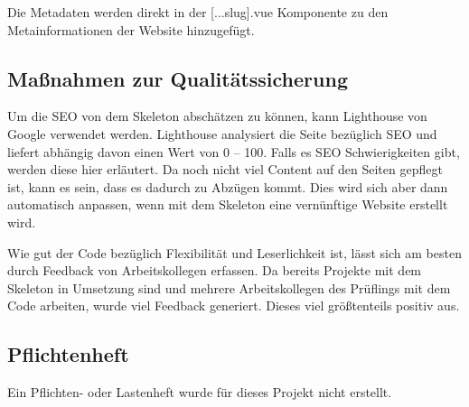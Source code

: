 Die Metadaten werden direkt in der [...slug].vue Komponente zu den Metainformationen der Website hinzugefügt.

\subsection{Maßnahmen zur Qualitätssicherung}
\label{sec:Qualitaetssicherung}

Um die SEO von dem Skeleton abschätzen zu können, kann Lighthouse von Google verwendet werden. Lighthouse analysiert die Seite bezüglich SEO und liefert abhängig davon einen Wert von 0 – 100. Falls es SEO Schwierigkeiten gibt, werden diese hier erläutert. Da noch nicht viel Content auf den Seiten gepflegt ist, kann es sein, dass es dadurch zu Abzügen kommt. Dies wird sich aber dann automatisch anpassen, wenn mit dem Skeleton eine vernünftige Website erstellt wird.

Wie gut der Code bezüglich Flexibilität und Leserlichkeit ist, lässt sich am besten durch Feedback von Arbeitskollegen erfassen. Da bereits Projekte mit dem Skeleton in Umsetzung sind und mehrere Arbeitskollegen des Prüflings mit dem Code arbeiten, wurde viel Feedback generiert. Dieses viel größtenteils positiv aus.

\subsection{Pflichtenheft}
\label{sec:Pflichtenheft}

Ein Pflichten- oder Lastenheft wurde für dieses Projekt nicht erstellt. 

